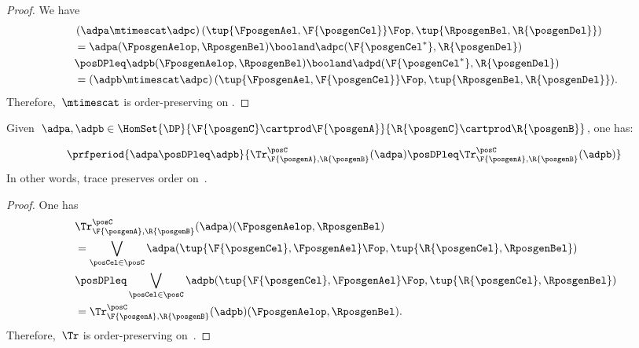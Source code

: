 \begin{proof}
	We have
	\begin{equation}
		\label{eq:tens_pres_ord}
		\begin{aligned}
			~ & \left( \adpa\mtimescat \adpc\right) (\tup{\FposgenAel,\F{\posgenCel}}\Fop,\tup{\RposgenBel,\R{\posgenDel}})   \\
			  & = \adpa(\FposgenAelop,\RposgenBel)\booland \adpc(\F{\posgenCel^*},\R{\posgenDel})                             \\
			  & \posDPleq \adpb(\FposgenAelop,\RposgenBel)\booland \adpd(\F{\posgenCel^*},\R{\posgenDel})                     \\
			  & =\left( \adpb\mtimescat \adpc\right) (\tup{\FposgenAel,\F{\posgenCel}}\Fop,\tup{\RposgenBel,\R{\posgenDel}}).
		\end{aligned}
	\end{equation}
	Therefore,~$\mtimescat$ is order-preserving on \DP.
\end{proof}

\begin{lemma}
	\label{lem:trace_pres_order}
	Given~$\adpa,\adpb\in \HomSet{\DP}{\F{\posgenC}\cartprod \F{\posgenA}}{\R{\posgenC}\cartprod \R{\posgenB}}$, one has:

	\begin{equation}
		\prfperiod{\adpa\posDPleq \adpb}{\Tr_{\F{\posgenA},\R{\posgenB}}^\posC(\adpa)\posDPleq \Tr_{\F{\posgenA},\R{\posgenB}}^\posC(\adpb)}
	\end{equation}
	In other words, trace preserves order on~\DP.
\end{lemma}

\begin{proof}
	One has
	\begin{equation}
		\label{eq:trace_pres_ord}
		\begin{aligned}
			~ & \Tr_{\F{\posgenA},\R{\posgenB}}^\posC(\adpa)(\FposgenAelop,\RposgenBel)                                          \\
			  & = \bigvee_{\posCel\in \posC}\adpa(\tup{\F{\posgenCel},\FposgenAel}\Fop,\tup{\R{\posgenCel},\RposgenBel})         \\
			  & \posDPleq \bigvee_{\posCel\in \posC}\adpb(\tup{\F{\posgenCel},\FposgenAel}\Fop,\tup{\R{\posgenCel},\RposgenBel}) \\
			  & =\Tr_{\F{\posgenA},\R{\posgenB}}^\posC(\adpb)(\FposgenAelop,\RposgenBel).
		\end{aligned}
	\end{equation}
	Therefore,~$\Tr$ is order-preserving on~\DP.
\end{proof}

